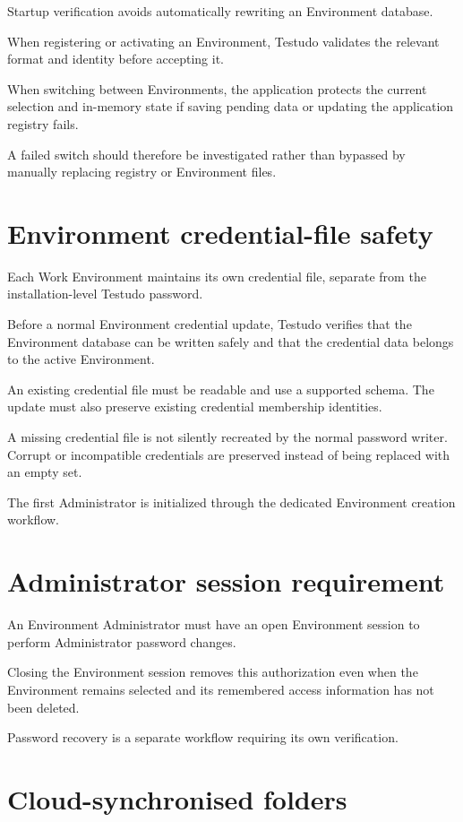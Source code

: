 \documentclass{testudomanual}
\begin{document}
Startup verification avoids automatically rewriting an Environment database.

When registering or activating an Environment, Testudo validates the relevant format and identity before accepting it.

When switching between Environments, the application protects the current selection and in-memory state if saving pending data or updating the application registry fails.

A failed switch should therefore be investigated rather than bypassed by manually replacing registry or Environment files.

\section{Environment credential-file safety}

Each Work Environment maintains its own credential file, separate from the installation-level Testudo password.

Before a normal Environment credential update, Testudo verifies that the Environment database can be written safely and that the credential data belongs to the active Environment.

An existing credential file must be readable and use a supported schema. The update must also preserve existing credential membership identities.

A missing credential file is not silently recreated by the normal password writer. Corrupt or incompatible credentials are preserved instead of being replaced with an empty set.

The first Administrator is initialized through the dedicated Environment creation workflow.

\section{Administrator session requirement}

An Environment Administrator must have an open Environment session to perform Administrator password changes.

Closing the Environment session removes this authorization even when the Environment remains selected and its remembered access information has not been deleted.

Password recovery is a separate workflow requiring its own verification.

\section{Cloud-synchronised folders}
\end{document}
